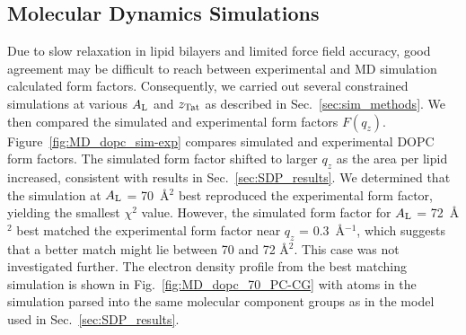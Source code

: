 
\newpage
\subsection{Molecular Dynamics Simulations}\label{sec:MD_results}
Due to slow relaxation in lipid bilayers and limited force field accuracy, 
good agreement may be difficult to reach between experimental and MD simulation 
calculated form factors. Consequently, we carried out several 
constrained simulations at various $A_\textrm{L}$ and $z_\textrm{Tat}$ as described
in Sec.~\ref{sec:sim_methods}. 
We then compared the simulated and experimental form factors $F(q_z)$. 
Figure~\ref{fig:MD_dopc_sim-exp}  
compares simulated and experimental DOPC form factors. 
The simulated form factor
shifted to larger $q_z$ as the area per lipid increased,
consistent with results in Sec.~\ref{sec:SDP_results}. 
We determined that the simulation
at $A_\textrm{L}$ = 70~\AA$^2$ best reproduced the experimental form
factor, yielding the smallest $\chi^2$ value. 
However, the simulated form factor for $A_\textrm{L}$ = 72~\AA$^2$ best matched the experimental
form factor near $q_z$ = 0.3~\AA$^{-1}$, 
which suggests that a better match might lie between 70 and 72 \AA$^2$. 
This case was not investigated further.
The electron density profile from the best matching simulation is shown in 
Fig.~\ref{fig:MD_dopc_70_PC-CG} with atoms in the simulation parsed
into the same molecular component groups as in the model used in 
Sec.~\ref{sec:SDP_results}.

